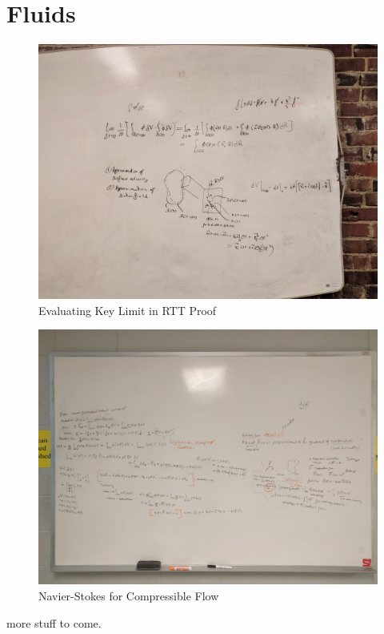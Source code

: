 \appendix

\chapter{Fluids}
\begin{figure}[h!]
    \centering
    \includegraphics[width=1.0\textwidth]{fig/RTT.jpg}
    \caption{Evaluating Key Limit in RTT Proof}
    \label{fig:rtt}
\end{figure}

\begin{figure}[h!]
    \centering
    \includegraphics[width=1.0\textwidth]{fig/NS.jpg}
    \caption{Navier-Stokes for Compressible Flow}
    \label{fig:ns}
\end{figure}
more stuff to come.


